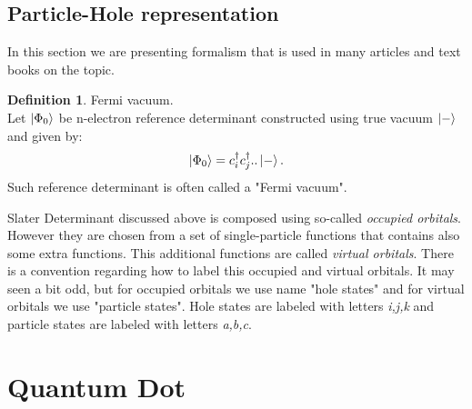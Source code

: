 \documentclass[twoside,english]{uiofysmaster}
\theoremstyle{definition}
\newtheorem{defn}{Definition}
\begin{document}



\section{Particle-Hole representation}
In this section we are presenting formalism that is used in many articles and text books on the topic.\\

\begin{defn}Fermi vacuum.\\
	Let $\ket{\Phi_0}$ be n-electron reference determinant constructed using true vacuum $\ket{-}$ and given by:
	\[ \ket{\Phi_0} = c^\dagger_i c^\dagger_j ..\ket{-}. \]
	Such reference determinant is often called a "Fermi vacuum".
\end{defn}

Slater Determinant discussed above is composed using so-called \textit{occupied orbitals}. However they are chosen from a set of single-particle functions that contains also some extra functions. This additional functions are called \textit{virtual orbitals}. There is a convention regarding how to label this occupied and virtual orbitals. It may seen a bit odd, but for occupied orbitals we use name "hole states" and for virtual orbitals we use "particle states". Hole states are labeled with letters \textit{i,j,k} and particle states are labeled with letters \textit{a,b,c}.\\





\chapter{Quantum Dot}
\end{document}
